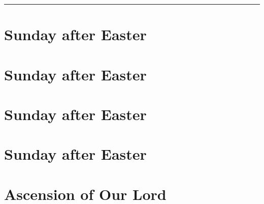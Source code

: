 {{\def\commemorations{If the Feast of the Annunciation has been transferred to the Monday following Low Sunday, \emph{First Vespers} is commemorated as on page \pageref{annunciation-commem}.  If today is April 30, May 1, or May 2, \emph{First Vespers of St Joseph the Worker} is commemorated as follows.}
\printcommemnote{}
}

\bigskip
\hrule
\medskip
{
\label{stjoseph-worker-commem}
\def\begincollectcols{\begin{parcolumns}[rulebetween,colwidths={1=0.43\linewidth}]{2}}
\def\vrlinebreak{T}

\bigskip
\benedicamusdomino{}
}

{
\section{ Sunday after Easter}
\label{easter2}
\printcommonvespers{}
\def\precollect{\printvrmanenobiscum}
\benedicamusdomino{}
}
{
\section{ Sunday after Easter}
\label{easter3}
\printcommonvespers{}
\def\begincollectcols{\begin{parcolumns}[rulebetween,colwidths={1=0.44\linewidth}]{2}}
\def\precollect{\printvrmanenobiscum}
\benedicamusdomino{}
}

{
\section{ Sunday after Easter}
\label{easter4}
\printcommonvespers{}
\def\precollect{\printvrmanenobiscum}
\benedicamusdomino{}
}

{
\section{ Sunday after Easter}
\label{easter5}
\printcommonvespers{}
\def\premagverses{\oldneedspace{12\baselineskip}}
\def\precollect{\printvrmanenobiscum}
\benedicamusdomino{}
}

{
\section{Ascension of Our Lord}
\label{ascension}
\subtitle{ Class, White or Gold}
\subtitle{I \& II Vespers}

}}
